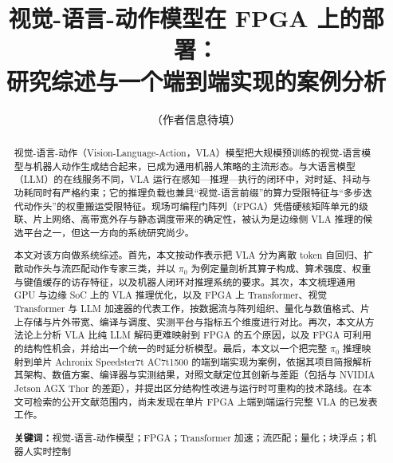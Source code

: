 \documentclass[a4paper,10.5pt]{ctexart}
\title{\textbf{视觉-语言-动作模型在 FPGA 上的部署：\\研究综述与一个端到端实现的案例分析}}
\author{（作者信息待填）}
\date{}
\newcommand{\pizero}{$\pi_0$}
\begin{document}
\maketitle

\begin{abstract}
\noindent
视觉-语言-动作（Vision-Language-Action，VLA）模型把大规模预训练的视觉-语言模型与机器人动作生成结合起来，已成为通用机器人策略的主流形态。与大语言模型（LLM）的在线服务不同，VLA 运行在感知—推理—执行的闭环中，对时延、抖动与功耗同时有严格约束；它的推理负载也兼具“视觉-语言前缀”的算力受限特征与“多步迭代动作头”的权重搬运受限特征。现场可编程门阵列（FPGA）凭借硬核矩阵单元的级联、片上网络、高带宽外存与静态调度带来的确定性，被认为是边缘侧 VLA 推理的候选平台之一，但这一方向的系统研究尚少。

本文对该方向做系统综述。首先，本文按动作表示把 VLA 分为离散 token 自回归、扩散动作头与流匹配动作专家三类，并以 \pizero{} 为例定量剖析其算子构成、算术强度、权重与键值缓存的访存特征，以及机器人闭环对推理系统的要求。其次，本文梳理通用 GPU 与边缘 SoC 上的 VLA 推理优化，以及 FPGA 上 Transformer、视觉 Transformer 与 LLM 加速器的代表工作，按数据流与阵列组织、量化与数值格式、片上存储与片外带宽、编译与调度、实测平台与指标五个维度进行对比。再次，本文从方法论上分析 VLA 比纯 LLM 解码更难映射到 FPGA 的五个原因，以及 FPGA 可利用的结构性机会，并给出一个统一的时延分析模型。最后，本文以一个把完整 \pizero{} 推理映射到单片 Achronix Speedster7t AC7t1500 的端到端实现为案例，依据其项目简报解析其架构、数值方案、编译器与实测结果，对照文献定位其创新与差距（包括与 NVIDIA Jetson AGX Thor 的差距），并提出区分结构性改进与运行时可重构的技术路线。在本文可检索的公开文献范围内，尚未发现在单片 FPGA 上端到端运行完整 VLA 的已发表工作。

\medskip
\noindent\textbf{关键词：}视觉-语言-动作模型；FPGA；Transformer 加速；流匹配；量化；块浮点；机器人实时控制
\end{abstract}
\end{document}
